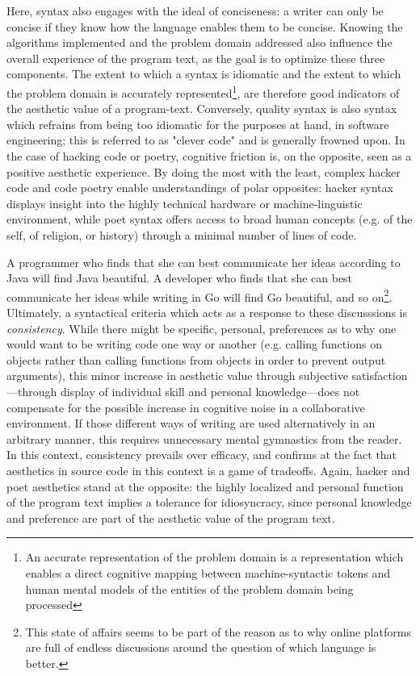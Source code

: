 Here, syntax also engages with the ideal of conciseness: a writer can only be concise if they know how the language enables them to be concise. Knowing the algorithms implemented and the problem domain addressed also influence the overall experience of the program text, as the goal is to optimize these three components. The extent to which a syntax is idiomatic and the extent to which the problem domain is accurately represented\footnote{An accurate representation of the problem domain is a representation which enables a direct cognitive mapping between machine-syntactic tokens and human mental models of the entities of the problem domain being processed}, are therefore good indicators of the aesthetic value of a program-text. Conversely, quality syntax is also syntax which refrains from being too idiomatic for the purposes at hand, in software engineering; this is referred to as "clever code" and is generally frowned upon. In the case of hacking code or poetry, cognitive friction is, on the opposite, seen as a positive aesthetic experience. By doing the most with the least, complex hacker code and code poetry enable understandings of polar opposites: hacker syntax displays insight into the highly technical hardware or machine-linguistic environment, while poet syntax offers access to broad human concepts (e.g. of the self, of religion, or history) through a minimal number of lines of code.

A programmer who finds that she can best communicate her ideas according to Java will find Java beautiful. A developer who finds that she can best communicate her ideas while writing in Go will find Go beautiful, and so on\footnote{ This state of affairs seems to be part of the reason as to why online platforms are full of endless discussions around the question of which language is better.}. Ultimately, a syntactical criteria which acts as a response to these discusssions is \emph{consistency}. While there might be specific, personal, preferences as to why one would want to be writing code one way or another (e.g. calling functions on objects rather than calling functions from objects in order to prevent output arguments), this minor increase in aesthetic value through subjective satisfaction—through display of individual skill and personal knowledge—does not compensate for the possible increase in cognitive noise in a collaborative environment. If those different ways of writing are used alternatively in an arbitrary manner, this requires unnecessary mental gymnastics from the reader. In this context, consistency prevails over efficacy, and confirms at the fact that aesthetics in source code in this context is a game of tradeoffs. Again, hacker and poet aesthetics stand at the opposite: the highly localized and personal function of the program text implies a tolerance for idiosyncracy, since personal knowledge and preference are part of the aesthetic value of the program text.

